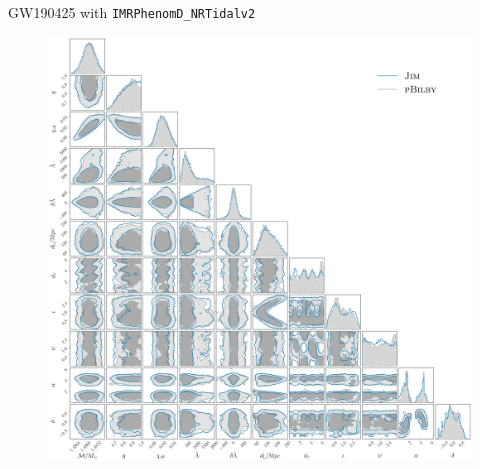 \documentclass[usenames,dvipsnames,t]{beamer}
\begin{document}
\begin{frame}{GW190425 with \texttt{IMRPhenomD\_NRTidalv2}}
  \vspace{-4.5mm}
  \begin{figure}
  \begin{minipage}[c]{0.2\textwidth}
    \caption{}\label{fig: GW190425 NRTidalv2}
    \end{minipage}\hfill
    \begin{minipage}[c]{0.8\textwidth}
    \includegraphics[scale = 0.132]{Figures/GW190425_NRTidalv2.pdf}
  \end{minipage}  
  \end{figure}
  
\end{frame}
\end{document}
